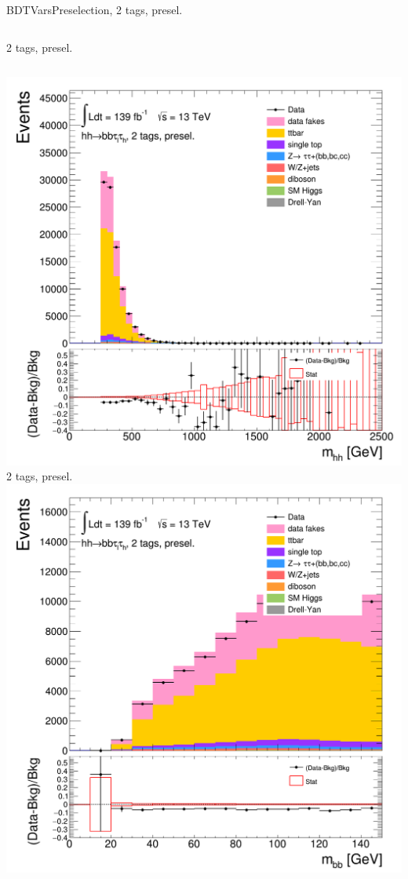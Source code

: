 \begin{frame}{BDTVarsPreselection, 2 tags, presel.}
\begin{columns}[c]
    2 tags, presel.
  \end{columns}
  \begin{columns}[c]
    \centering\includegraphics[width=\textwidth]{C_2tag2pjet_0ptv_Mhh}\\
    2 tags, presel.
    \centering\includegraphics[width=\textwidth]{C_2tag2pjet_0ptv_mbb}\\

\end{columns}
\end{frame}
